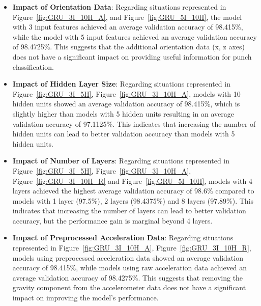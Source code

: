 \documentclass{article}
\begin{document}
    \FloatBarrier
    \begin{itemize}
        \item \textbf{Impact of Orientation Data}: Regarding situations represented
            in Figure~\ref{fig:GRU_3I_10H_A}, and Figure~\ref{fig:GRU_5I_10H}, the
            model with 3 input features achieved an average validation accuracy of
            98.415\%, while the model with 5 input features achieved an average validation
            accuracy of 98.4725\%. This suggests that the additional orientation
            data (x, z axes) does not have a significant impact on providing
            useful information for punch classification.

        \item \textbf{Impact of Hidden Layer Size}: Regarding situations represented
            in Figure~\ref{fig:GRU_3I_5H}, Figure~\ref{fig:GRU_3I_10H_A}, models
            with 10 hidden units showed an average validation accuracy of 98.415\%,
            which is slightly higher than models with 5 hidden units resulting in
            an average validation accuracy of 97.1125\%. This indicates that increasing
            the number of hidden units can lead to better validation accuracy than
            models with 5 hidden units.

        \item \textbf{Impact of Number of Layers}: Regarding situations represented
            in Figure~\ref{fig:GRU_3I_5H}, Figure~\ref{fig:GRU_3I_10H_A}, Figure~\ref{fig:GRU_3I_10H_R}
            and Figure~\ref{fig:GRU_5I_10H}, models with 4 layers achieved the
            highest average validation accuracy of 98.6\% compared to models with
            1 layer (97.5\%), 2 layers (98.4375\%) and 8 layers (97.89\%). This
            indicates that increasing the number of layers can lead to better
            validation accuracy, but the performance gain is marginal beyond 4 layers.

        \item \textbf{Impact of Preprocessed Acceleration Data}: Regarding situations
            represented in Figure~\ref{fig:GRU_3I_10H_A}, Figure~\ref{fig:GRU_3I_10H_R},
            models using preprocessed acceleration data showed an average validation
            accuracy of 98.415\%, while models using raw acceleration data achieved
            an average validation accuracy of 98.4275\%. This suggests that removing
            the gravity component from the accelerometer data does not have a significant
            impact on improving the model's performance.
    \end{itemize}
\end{document}
